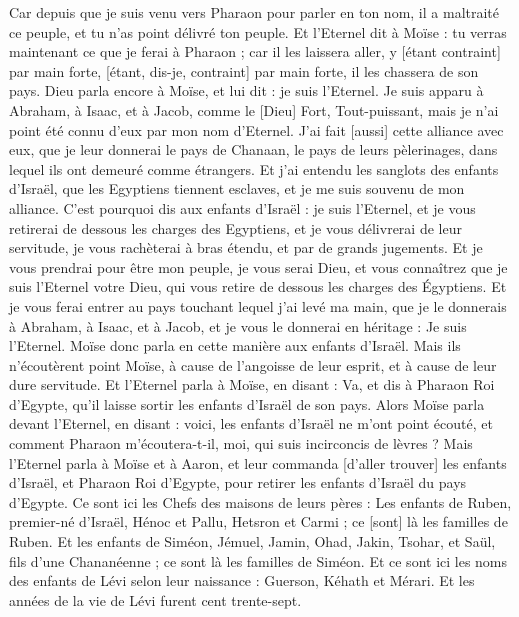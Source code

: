 \begin{multicols}{2}
Car depuis que je suis venu vers Pharaon pour parler en ton nom, il a maltraité ce peuple, et tu n'as point délivré ton peuple.
\VerseOne{}Et l'Eternel dit à Moïse : tu verras maintenant ce que je ferai à Pharaon ; car il les laissera aller, y [étant contraint] par main forte, [étant, dis-je, contraint] par main forte, il les chassera de son pays.
Dieu parla encore à Moïse, et lui dit : je suis l'Eternel.
Je suis apparu à Abraham, à Isaac, et à Jacob, comme le [Dieu] Fort, Tout-puissant, mais je n'ai point été connu d'eux par mon nom d'Eternel.
J'ai fait [aussi] cette alliance avec eux, que je leur donnerai le pays de Chanaan, le pays de leurs pèlerinages, dans lequel ils ont demeuré comme étrangers.
Et j'ai entendu les sanglots des enfants d'Israël, que les Egyptiens tiennent esclaves, et je me suis souvenu de mon alliance.
C'est pourquoi dis aux enfants d'Israël : je suis l'Eternel, et je vous retirerai de dessous les charges des Egyptiens, et je vous délivrerai de leur servitude, je vous rachèterai à bras étendu, et par de grands jugements.
Et je vous prendrai pour être mon peuple, je vous serai Dieu, et vous connaîtrez que je suis l'Eternel votre Dieu, qui vous retire de dessous les charges des Égyptiens.
Et je vous ferai entrer au pays touchant lequel j'ai levé ma main, que je le donnerais à Abraham, à Isaac, et à Jacob, et je vous le donnerai en héritage : Je suis l'Eternel.
Moïse donc parla en cette manière aux enfants d'Israël. Mais ils n'écoutèrent point Moïse, à cause de l'angoisse de leur esprit, et à cause de leur dure servitude.
Et l'Eternel parla à Moïse, en disant :
Va, et dis à Pharaon Roi d'Egypte, qu'il laisse sortir les enfants d'Israël de son pays.
Alors Moïse parla devant l'Eternel, en disant : voici, les enfants d'Israël ne m'ont point écouté, et comment Pharaon m'écoutera-t-il, moi, qui suis incirconcis de lèvres ?
Mais l'Eternel parla à Moïse et à Aaron, et leur commanda [d'aller trouver] les enfants d'Israël, et Pharaon Roi d'Egypte, pour retirer les enfants d'Israël du pays d'Egypte.
Ce sont ici les Chefs des maisons de leurs pères : Les enfants de Ruben, premier-né d'Israël, Hénoc et Pallu, Hetsron et Carmi ; ce [sont] là les familles de Ruben.
Et les enfants de Siméon, Jémuel, Jamin, Ohad, Jakin, Tsohar, et Saül, fils d'une Chananéenne ; ce sont là les familles de Siméon.
Et ce sont ici les noms des enfants de Lévi selon leur naissance : Guerson, Kéhath et Mérari. Et les années de la vie de Lévi furent cent trente-sept.

\end{multicols}
